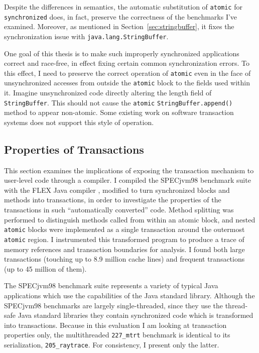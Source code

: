 \documentclass[12pt]{article}
\newcommand{\subsecput}[2]{\subsection{#2}\label{sec:#1}}
\newcommand{\secref}[1]         {Section~\ref{sec:#1}}
\begin{document}
Despite the differences in semantics, the automatic substitution of
{\tt atomic} for {\tt synchronized} does, in fact, preserve the
correctness of the benchmarks I've examined.  Moreover, as
mentioned in \secref{stringbuffer}, it
fixes the synchronization issue with {\tt java.lang.StringBuffer}.

One goal of this thesis is to make such improperly synchronized
applications correct and race-free, in effect fixing certain common
synchronization errors.  To this effect, I need to preserve the
correct operation of {\tt atomic} even in the face of unsynchronized
accesses from outside the {\tt atomic} block to the fields used within
it.  Imagine unsynchronized code directly altering the length field of
{\tt StringBuffer}.  This should not cause the {\tt atomic}
{\tt StringBuffer.append()} method to appear non-atomic.
Some existing work on software transaction systems \cite{HarrisFr03}
does not support this style of operation.

\subsecput{properties}{Properties of Transactions}
This section examines the implications of exposing the transaction
mechanism to user-level code through a compiler.
I compiled the SPECjvm98 benchmark suite with the FLEX Java compiler
\cite{Flex},
modified to turn synchronized blocks and methods into transactions,
in order to investigate the properties of the transactions in such
``automatically converted'' code.
Method splitting was performed to distinguish methods called from
within an atomic block, and nested
\texttt{atomic} blocks were implemented as a single
transaction around the outermost \texttt{atomic} region.  I
instrumented this transformed program to produce a trace of
memory references and transaction boundaries for analysis.
I found both large
transactions (touching up to 8.9 million cache lines) and frequent
transactions (up to 45 million of them).

The SPECjvm98 benchmark suite represents a variety of typical Java
applications which use the capabilities of the Java standard library.
Although the SPECjvm98 benchmarks are largely single-threaded, since
they use the thread-safe Java standard libraries they contain
synchronized code which is transformed into transactions.  Because in
this evaluation I am looking at transaction properties only, the
multithreaded \texttt{227\_mtrt} benchmark is identical to its
serialization, \texttt{205\_raytrace}.  For consistency, I present
only the latter.
\end{document}
